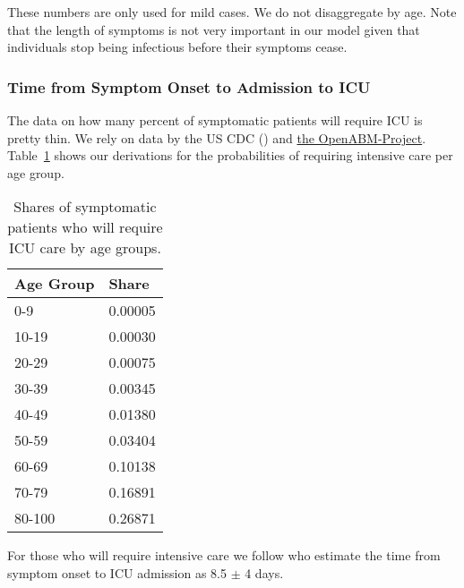 These numbers are only used for mild cases. We do not disaggregate by age. Note that the length of symptoms is not very important in our model given that individuals stop being infectious before their symptoms cease.


\subsubsection{Time from Symptom Onset to Admission to ICU}

The data on how many percent of symptomatic patients will require ICU is pretty thin. We rely on data by the US CDC (\citet{Stokes2020}) and \href{https://github.com/BDI-pathogens/OpenABM-Covid19/blob/572e24ca2dbf7153789a92ad3a27e4c515d0e576/documentation/parameters/parameter_dictionary.md}{the OpenABM-Project}. Table~\ref{tab:symptomatic-to-ICU} shows our derivations for the probabilities of requiring intensive care per age group.

\begin{table}[tb]
    \caption{Shares of symptomatic patients who will require ICU care by age groups.}
    \label{tab:symptomatic-to-ICU}
    \centering

    \begin{tabular}{ll}
        \toprule
        Age Group & Share \\
        \midrule
        0-9 & 0.00005 \\
        10-19 & 0.00030 \\
        20-29 & 0.00075 \\
        30-39 & 0.00345 \\
        40-49 & 0.01380 \\
        50-59 & 0.03404 \\
        60-69 & 0.10138 \\
        70-79 & 0.16891 \\
        80-100 & 0.26871 \\
        \bottomrule
    \end{tabular}


\end{table}

For those who will require intensive care we follow \citet{Chen2020} who estimate the time from symptom onset to ICU admission as 8.5 $\pm$ 4 days.

